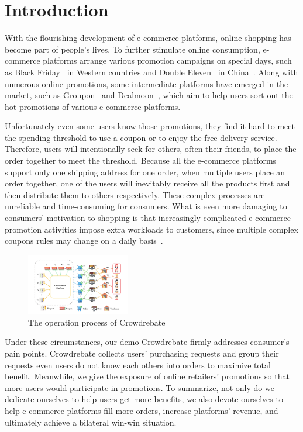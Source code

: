 \section{Introduction}

With the flourishing development of e-commerce platforms, online shopping has become part of people's lives. To further stimulate online consumption, e-commerce platforms arrange various promotion campaigns on special days, such as Black Friday~\cite{2013Black} in Western countries and Double Eleven~\cite{double11} in China~\cite{huang2019x}. Along with numerous online promotions, some intermediate platforms have emerged in the market, such as Groupon~\cite{groupon} and Dealmoon~\cite{dealmoon}, which aim to help users sort out the hot promotions of various e-commerce platforms.

Unfortunately even some users know those promotions, they find it hard to meet the spending threshold to use a coupon or to enjoy the free delivery service. Therefore, users will intentionally seek for others, often their friends, to place the order together to meet the threshold. Because all the e-commerce platforms support only one shipping address for one order, when multiple users place an order together, one of the users will inevitably receive all the products first and then distribute them to others respectively. These complex processes are unreliable and time-consuming for consumers. What is even more damaging to consumers' motivation to shopping is that increasingly complicated e-commerce promotion activities impose extra workloads to customers, since multiple complex coupons rules may change on a daily basis~\cite{double2020}.
\begin{figure}[t]\vspace{-2ex} 
\centering %
		\includegraphics[width=0.4\textwidth]{../figure/crowdrebate process.png} %
	\caption{The operation process of Crowdrebate} %
	\label{fig:Crowdrebate} %
	\vspace{-2ex}
	\end{figure}

Under these circumstances, our demo-Crowdrebate firmly addresses consumer's pain points. Crowdrebate collects users' purchasing requests and group their requests even users do not know each others into orders to maximize total benefit. Meanwhile, we give the exposure of online retailers' promotions so that more users would participate in promotions. To summarize, not only do we dedicate ourselves to help users get more benefits, we also devote ourselves to help e-commerce platforms fill more orders, increase platforms’ revenue, and ultimately achieve a bilateral win-win situation.

